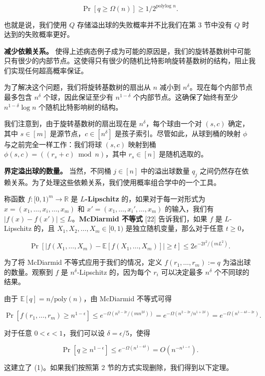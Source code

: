\documentclass[12pt,a4paper]{ctexart}
\theoremstyle{remark}
\begin{document}
$$\Pr[q\geq\Omega(n)]\geq 1/2^{\text{polylog } n}.$$

也就是说，我们使用 $Q$ 存储溢出球的失败概率并不比我们在第 3 节中没有 $Q$ 时达到的失败概率更好。

\textbf{减少依赖关系。} 使得上述病态例子成为可能的原因是，我们的旋转基数树中可能只有很少的内部节点。这使得只有很少的随机比特影响旋转基数树的结构，阻止我们实现任何超高概率保证。

为了解决这个问题，我们将旋转基数树的扇出从 $n$ 减小到 $n^{\delta}$。现在每个内部节点最多包含 $n^{\delta}$ 个球，因此保证至少有 $n^{1-\delta}$ 个内部节点。这确保了始终有至少 $n^{1-\delta}\log n$ 个随机比特影响树的结构。

我们注意到，由于旋转基数树的扇出现在是 $n^{\delta}$，每个球由一个对 $(s,c)$ 确定，其中 $s\in[m]$ 是源节点，$c\in[n^{\delta}]$ 是孩子索引。尽管如此，从球到桶的映射 $\phi$ 与之前完全一样工作：我们将球 $(s,c)$ 映射到桶 $\phi(s,c)=((r_s+c)\bmod n)$，其中 $r_s\in[n]$ 是随机选取的。

\textbf{界定溢出球的数量。} 当然，不同桶 $j\in[n]$ 中的溢出球数量 $q_j$ 之间仍然存在依赖关系。为了处理这些依赖关系，我们使用概率组合学中的一个工具。

称函数 $f:[0,1)^m\to\mathbb{R}$ 是 $L$\textbf{-Lipschitz} 的，如果对于每一对形式为 $x=(x_1,\ldots,x_i,\ldots,x_m)$ 和 $x'=(x_1,\ldots,x_i',\ldots,x_m)$ 的输入，我们有 $|f(x)-f(x')|\leq L$。\textbf{McDiarmid 不等式} [22] 告诉我们，如果 $f$ 是 $L$-Lipschitz 的，且 $X_1,X_2,\ldots,X_m\in[0,1)$ 是独立随机变量，那么对于任意 $t\geq 0$，

$$\Pr[|f(X_1,\ldots,X_m)-\mathbb{E}[f(X_1,\ldots,X_m)]|\geq t]\leq 2e^{-2t^2/(mL^2)}.$$

为了将 McDiarmid 不等式应用于我们的情况，定义 $f(r_1,\ldots,r_m):=q$ 为溢出球的数量。观察到 $f$ 是 $n^{\delta}$-Lipschitz 的，因为每个 $r_i$ 可以决定最多 $n^{\delta}$ 个不同球的结果。

由于 $\mathbb{E}[q]=n/\text{poly}(n)$，由 McDiarmid 不等式可得

$$\Pr[f(r_1,\ldots,r_m)\geq n^{1-\epsilon}]\leq e^{-\Omega(n^{2-2\epsilon}/(mn^{2\delta}))}=e^{-\Omega(n^{2-2\epsilon}/n^{1+2\delta})}=e^{-\Omega(n^{1-4\delta-2\epsilon})}.$$

对于任意 $0<\epsilon<1$，我们可以设 $\delta=\epsilon/5$，使得

$$\Pr[q\geq n^{1-\epsilon}]\leq e^{-\Omega(n^{1-4\delta})}=O\left(n^{-n^{1-\epsilon}}\right).$$

这建立了 (1)。如果我们按照第 2 节的方式实现删除，我们得到以下定理。
\end{document}
